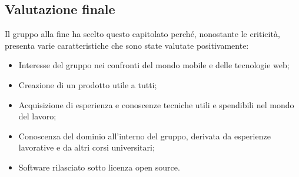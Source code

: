 \subsection{Valutazione finale}
Il gruppo alla fine ha scelto questo capitolato perché, nonostante le criticità, presenta varie caratteristiche che sono state valutate positivamente:
\begin{itemize}
 \item Interesse del gruppo nei confronti del mondo mobile e delle tecnologie web;
 \item Creazione di un prodotto utile a tutti;
 \item Acquisizione di esperienza e conoscenze tecniche utili e spendibili nel mondo del lavoro;
 \item Conoscenza del dominio all'interno del gruppo, derivata da esperienze lavorative e da altri corsi universitari;
\item Software rilasciato sotto licenza open source.
\end{itemize}
